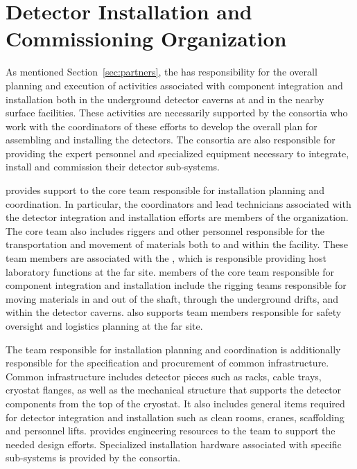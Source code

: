 \chapter{Detector Installation and Commissioning Organization}
\label{ch:tc-jpo}

As mentioned Section~\ref{sec:partners}, the  has
responsibility for the overall planning and execution of activities
associated with component integration and installation both in the
underground detector caverns at  and in the nearby surface
facilities.  These activities are necessarily supported by the
 consortia who work with the  coordinators of
these efforts to develop the overall plan for assembling and
installing the detectors.  The consortia are also responsible for
providing the expert personnel and specialized equipment necessary to
integrate, install and commission their detector sub-systems.

  provides support to the core  team
responsible for installation planning and coordination.  In
particular, the coordinators and lead technicians associated with the
detector integration and installation efforts are members of the
 organization.  The core team also includes riggers and
other personnel responsible for the transportation and movement of
materials both to and within the  facility.  These team members
are associated with the , which is responsible providing
host laboratory functions at the far site.  members of the
 core team responsible for component integration and
installation include the rigging teams responsible for moving
materials in and out of the shaft, through the underground drifts,
and within the detector caverns.  also supports team
members responsible for safety oversight and logistics planning at the
far site.

The  team responsible for installation planning and
coordination is additionally responsible for the specification and
procurement of common infrastructure.  Common infrastructure includes
detector pieces such as racks, cable trays, cryostat flanges, as well
as the mechanical structure that supports the detector components from
the top of the cryostat.  It also includes general items required for
detector integration and installation such as clean rooms, cranes,
scaffolding and personnel lifts.    provides
engineering resources to the  team to support the needed
design efforts. Specialized installation hardware associated with
specific sub-systems is provided by the consortia.


